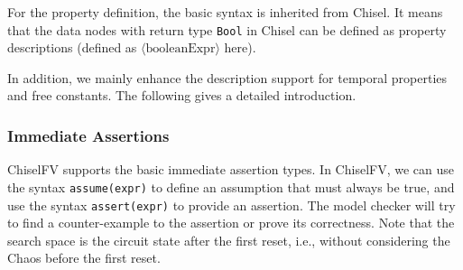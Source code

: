 \documentclass[conference]{IEEEtran}
\theoremstyle{definition}
\begin{document}
For the property definition, the basic syntax is inherited from Chisel. It means that the data nodes with return type \verb|Bool| in Chisel can be defined as property descriptions (defined as $\langle \text{booleanExpr} \rangle$ here).

In addition, we mainly enhance the description support for temporal properties and free constants. The following gives a detailed introduction.

\subsubsection{Immediate Assertions}
ChiselFV supports the basic immediate assertion types.
In ChiselFV, we can use the syntax \verb|assume(expr)| to define an assumption that must always be true, and use the syntax \verb|assert(expr)| to provide an assertion. The model checker will try to find a counter-example to the assertion or prove its correctness. Note that the search space is the circuit state after the first reset, i.e., without considering the Chaos before the first reset.
\end{document}
